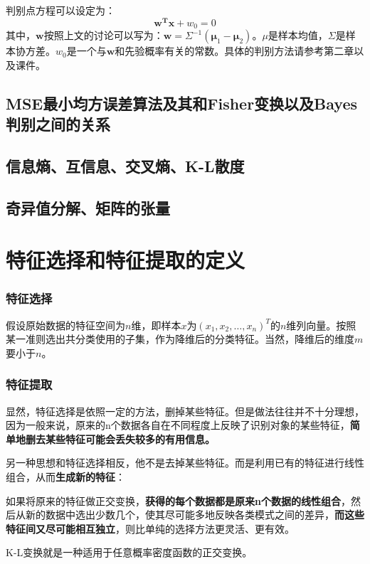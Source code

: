 \documentclass[12pt, letterpaper]{article}
\begin{document}
判别点方程可以设定为：
\begin{equation}
\mathbf{w^Tx}+w_0=0
\end{equation}
其中，$\mathbf{w}$按照上文的讨论可以写为：$\mathbf{w}=\Sigma^{-1}(\mathbf{\mu}_1-\mathbf{\mu}_2)$。$\mu$是样本均值，$\Sigma$是样本协方差。$w_0$是一个与$\mathbf{w}$和先验概率有关的常数。具体的判别方法请参考第二章以及课件。


\subsection{MSE最小均方误差算法及其和Fisher变换以及Bayes判别之间的关系}
\subsection{信息熵、互信息、交叉熵、K-L散度}
\subsection{奇异值分解、矩阵的张量}

\section{特征选择和特征提取的定义}
\subsubsection*{特征选择}
假设原始数据的特征空间为$n$维，即样本$x$为$(x_1,x_2,\ldots,x_n)^T$的$n$维列向量。按照某一准则选出共分类使用的子集，作为降维后的分类特征。当然，降维后的维度$m$要小于$n$。
\subsubsection*{特征提取}
显然，特征选择是依照一定的方法，删掉某些特征。但是做法往往并不十分理想，因为一般来说，原来的n个数据各自在不同程度上反映了识别对象的某些特征，\textbf{简单地删去某些特征可能会丢失较多的有用信息。}

另一种思想和特征选择相反，他不是去掉某些特征。而是利用已有的特征进行线性组合，从而\textbf{生成新的特征}：

如果将原来的特征做正交变换，\textbf{获得的每个数据都是原来n个数据的线性组合}，然后从新的数据中选出少数几个，使其尽可能多地反映各类模式之间的差异，\textbf{而这些特征间又尽可能相互独立}，则比单纯的选择方法更灵活、更有效。

K-L变换就是一种适用于任意概率密度函数的正交变换。
\end{document}

